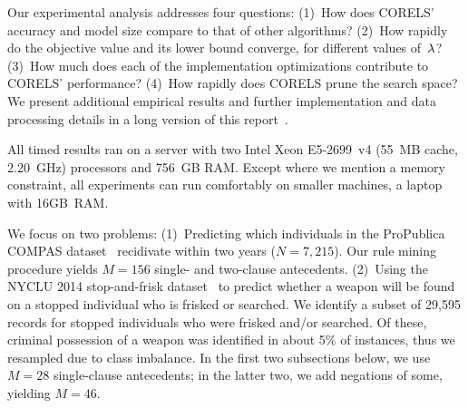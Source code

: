 
Our experimental analysis addresses four questions:
(1)~How does CORELS' accuracy and model size compare to that of other algorithms?
(2)~How rapidly do the objective value and its lower bound converge, for different values of~${\lambda}$?
(3)~How much does each of the implementation optimizations contribute to CORELS' performance?
(4)~How rapidly does CORELS prune the search space?
We present additional empirical results and further implementation and data processing details
in a long version of this report~\citep{AngelinoLaAlSeRu17}.

All timed results ran on a server with two Intel Xeon E5-2699~v4
(55~MB cache, 2.20~GHz) processors and 756~GB RAM.
%
Except where we mention a memory constraint, all experiments
can run comfortably on smaller machines, \eg a laptop with 16GB~RAM.

We focus on two problems:
(1)~Predicting which individuals in the ProPublica COMPAS dataset~\citep{LarsonMaKiAn16}
recidivate within two years (${N = 7,215}$).
Our rule mining procedure yields ${M = 156}$ single- and two-clause antecedents.
%
(2)~Using the NYCLU 2014 stop-and-frisk dataset~\citep{nyclu:2014}
to predict whether a weapon will be found on a stopped individual who is frisked or searched.
We identify a subset of 29,595 records for stopped individuals who were frisked and/or searched.
Of these, criminal possession of a weapon was identified in about 5\% of instances,
thus we resampled due to class imbalance.
In the first two subsections below, we use ${M =28}$ single-clause antecedents;
in the latter two, we add negations of some, yielding ${M =46}$.

